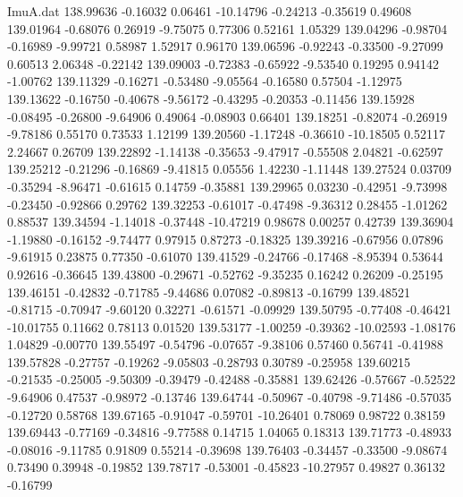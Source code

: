 \begin{filecontents}{ImuA.dat}
 138.99636   -0.16032    0.06461  -10.14796   -0.24213   -0.35619    0.49608
 139.01964   -0.68076    0.26919   -9.75075    0.77306    0.52161    1.05329
 139.04296   -0.98704   -0.16989   -9.99721    0.58987    1.52917    0.96170
 139.06596   -0.92243   -0.33500   -9.27099    0.60513    2.06348   -0.22142
 139.09003   -0.72383   -0.65922   -9.53540    0.19295    0.94142   -1.00762
 139.11329   -0.16271   -0.53480   -9.05564   -0.16580    0.57504   -1.12975
 139.13622   -0.16750   -0.40678   -9.56172   -0.43295   -0.20353   -0.11456
 139.15928   -0.08495   -0.26800   -9.64906    0.49064   -0.08903    0.66401
 139.18251   -0.82074   -0.26919   -9.78186    0.55170    0.73533    1.12199
 139.20560   -1.17248   -0.36610  -10.18505    0.52117    2.24667    0.26709
 139.22892   -1.14138   -0.35653   -9.47917   -0.55508    2.04821   -0.62597
 139.25212   -0.21296   -0.16869   -9.41815    0.05556    1.42230   -1.11448
 139.27524    0.03709   -0.35294   -8.96471   -0.61615    0.14759   -0.35881
 139.29965    0.03230   -0.42951   -9.73998   -0.23450   -0.92866    0.29762
 139.32253   -0.61017   -0.47498   -9.36312    0.28455   -1.01262    0.88537
 139.34594   -1.14018   -0.37448  -10.47219    0.98678    0.00257    0.42739
 139.36904   -1.19880   -0.16152   -9.74477    0.97915    0.87273   -0.18325
 139.39216   -0.67956    0.07896   -9.61915    0.23875    0.77350   -0.61070
 139.41529   -0.24766   -0.17468   -8.95394    0.53644    0.92616   -0.36645
 139.43800   -0.29671   -0.52762   -9.35235    0.16242    0.26209   -0.25195
 139.46151   -0.42832   -0.71785   -9.44686    0.07082   -0.89813   -0.16799
 139.48521   -0.81715   -0.70947   -9.60120    0.32271   -0.61571   -0.09929
 139.50795   -0.77408   -0.46421  -10.01755    0.11662    0.78113    0.01520
 139.53177   -1.00259   -0.39362  -10.02593   -1.08176    1.04829   -0.00770
 139.55497   -0.54796   -0.07657   -9.38106    0.57460    0.56741   -0.41988
 139.57828   -0.27757   -0.19262   -9.05803   -0.28793    0.30789   -0.25958
 139.60215   -0.21535   -0.25005   -9.50309   -0.39479   -0.42488   -0.35881
 139.62426   -0.57667   -0.52522   -9.64906    0.47537   -0.98972   -0.13746
 139.64744   -0.50967   -0.40798   -9.71486   -0.57035   -0.12720    0.58768
 139.67165   -0.91047   -0.59701  -10.26401    0.78069    0.98722    0.38159
 139.69443   -0.77169   -0.34816   -9.77588    0.14715    1.04065    0.18313
 139.71773   -0.48933   -0.08016   -9.11785    0.91809    0.55214   -0.39698
 139.76403   -0.34457   -0.33500   -9.08674    0.73490    0.39948   -0.19852
 139.78717   -0.53001   -0.45823  -10.27957    0.49827    0.36132   -0.16799

\end{filecontents}
